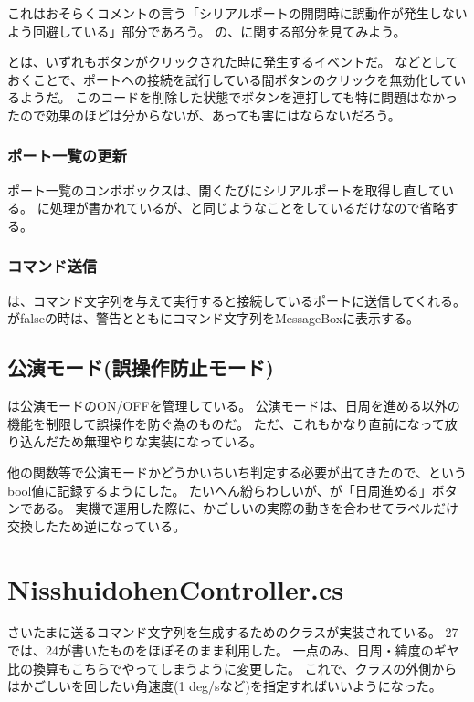 \documentclass[letterpaper,10pt,dvipdfmx]{sphinxmanual}
\begin{document}
これはおそらくコメントの言う「シリアルポートの開閉時に誤動作が発生しないよう回避している」部分であろう。
の、に関する部分を見てみよう。

とは、いずれもボタンがクリックされた時に発生するイベントだ。
などとしておくことで、ポートへの接続を試行している間ボタンのクリックを無効化しているようだ。
このコードを削除した状態でボタンを連打しても特に問題はなかったので効果のほどは分からないが、あっても害にはならないだろう。


\subsubsection{ポート一覧の更新}
\label{\detokenize{nissyu-idohen/pc-software-code:id16}}
ポート一覧のコンボボックスは、開くたびにシリアルポートを取得し直している。
に処理が書かれているが、と同じようなことをしているだけなので省略する。


\subsubsection{コマンド送信}
\label{\detokenize{nissyu-idohen/pc-software-code:id17}}
は、コマンド文字列を与えて実行すると接続しているポートに送信してくれる。
がfalseの時は、警告とともにコマンド文字列をMessageBoxに表示する。


\subsection{公演モード(誤操作防止モード)}
\label{\detokenize{nissyu-idohen/pc-software-code:id18}}
は公演モードのON/OFFを管理している。
公演モードは、日周を進める以外の機能を制限して誤操作を防ぐ為のものだ。
ただ、これもかなり直前になって放り込んだため無理やりな実装になっている。

他の関数等で公演モードかどうかいちいち判定する必要が出てきたので、というbool値に記録するようにした。
たいへん紛らわしいが、が「日周進める」ボタンである。
実機で運用した際に、かごしいの実際の動きを合わせてラベルだけ交換したため逆になっている。


\section{NisshuidohenController.cs}
\label{\detokenize{nissyu-idohen/pc-software-code:nisshuidohencontroller-cs}}
さいたまに送るコマンド文字列を生成するためのクラスが実装されている。
27では、24が書いたものをほぼそのまま利用した。
一点のみ、日周・緯度のギヤ比の換算もこちらでやってしまうように変更した。
これで、クラスの外側からはかごしいを回したい角速度(1
deg/sなど)を指定すればいいようになった。
\end{document}
